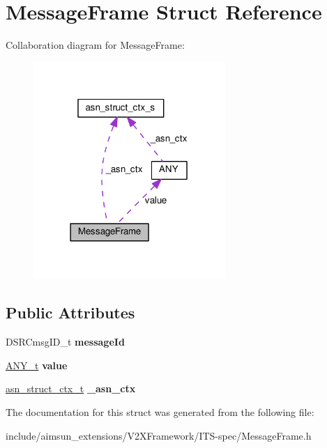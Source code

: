 \hypertarget{structMessageFrame}{}\section{Message\+Frame Struct Reference}
\label{structMessageFrame}


Collaboration diagram for Message\+Frame\+:\nopagebreak
\begin{figure}[H]
\begin{center}
\leavevmode
\includegraphics[width=206pt]{structMessageFrame__coll__graph}
\end{center}
\end{figure}
\subsection*{Public Attributes}
\begin{DoxyCompactItemize}
\item 
D\+S\+R\+Cmsg\+I\+D\+\_\+t {\bfseries message\+Id}\hypertarget{structMessageFrame_ace8e40ac66c6077b8cc67e81c188a0df}{}\label{structMessageFrame_ace8e40ac66c6077b8cc67e81c188a0df}

\item 
\hyperlink{structANY}{A\+N\+Y\+\_\+t} {\bfseries value}\hypertarget{structMessageFrame_a5bb18fe9b6372e440fad936b7d434b12}{}\label{structMessageFrame_a5bb18fe9b6372e440fad936b7d434b12}

\item 
\hyperlink{structasn__struct__ctx__s}{asn\+\_\+struct\+\_\+ctx\+\_\+t} {\bfseries \+\_\+asn\+\_\+ctx}\hypertarget{structMessageFrame_a7f66e74165ba0269afd7893f25f9c63d}{}\label{structMessageFrame_a7f66e74165ba0269afd7893f25f9c63d}

\end{DoxyCompactItemize}


The documentation for this struct was generated from the following file\+:\begin{DoxyCompactItemize}
\item 
include/aimsun\+\_\+extensions/\+V2\+X\+Framework/\+I\+T\+S-\/spec/Message\+Frame.\+h\end{DoxyCompactItemize}

